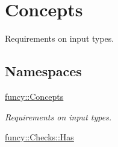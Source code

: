 \hypertarget{group__ConceptGroup}{\section{Concepts}
\label{group__ConceptGroup}
}


Requirements on input types.  


\subsection*{Namespaces}
\begin{DoxyCompactItemize}
\item 
\hyperlink{namespacefuncy_1_1Concepts}{funcy\-::\-Concepts}
\begin{DoxyCompactList}\small\item\em Requirements on input types. \end{DoxyCompactList}\item 
\hyperlink{namespacefuncy_1_1Checks_1_1Has}{funcy\-::\-Checks\-::\-Has}
\end{DoxyCompactItemize}

